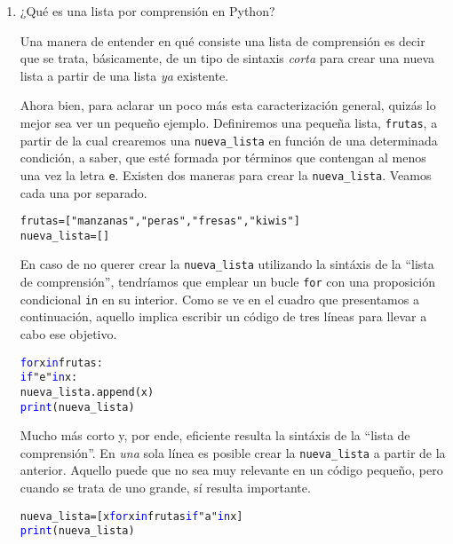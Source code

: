 \documentclass{article}
\begin{document}
\begin{enumerate}
\item ¿Qué es una lista por comprensión en Python?
\par \hspace{5pt} Una manera de entender en qué consiste una lista de comprensión es decir que se trata, básicamente, de un tipo de sintaxis \emph{corta} para crear una nueva lista a partir de una lista \emph{ya} existente.
\par \hspace{5pt} Ahora bien, para aclarar un poco más esta caracterización general, quizás lo mejor sea ver un pequeño ejemplo. Definiremos una pequeña lista, \verb|frutas|, a partir de la cual crearemos una \verb|nueva_lista| en función de una determinada condición, a saber, que esté formada por términos que contengan al menos una vez la letra \verb|e|. Existen dos maneras para crear la \verb|nueva_lista|. Veamos cada una por separado.
\begin{tcolorbox}
\begin{alltt}
frutas = ["manzanas", "peras", "fresas", "kiwis"]
nueva_lista = [ ]
\end{alltt}        
\end{tcolorbox} 
\par \hspace{5pt} En caso de no querer crear la \verb|nueva_lista| utilizando la sintáxis de la ``lista de comprensión'', tendríamos que emplear un bucle \verb|for| con una proposición condicional \verb|in| en su interior. Como se ve en el cuadro que presentamos a continuación, aquello implica escribir un código de tres líneas para llevar a cabo ese objetivo.
\begin{tcolorbox}
\begin{alltt}
\textcolor{blue}{for} x \textcolor{blue}{in} frutas:
  \textcolor{blue}{if} "e" \textcolor{blue}{in} x:
    nueva_lista.append(x)
\textcolor{blue}{print}(nueva_lista)
\end{alltt}        
\end{tcolorbox}
 Mucho más corto y, por ende, eficiente resulta la sintáxis de la ``lista de comprensión''. En \emph{una} sola línea es posible crear la \verb|nueva_lista| a partir de la anterior. Aquello puede que no sea muy relevante en un código pequeño, pero cuando se trata de uno grande, sí resulta importante.
\begin{tcolorbox}
\begin{alltt}
nueva_lista = [x \textcolor{blue}{for} x \textcolor{blue}{in} frutas \textcolor{blue}{if} "a" \textcolor{blue}{in} x]
\textcolor{blue}{print}(nueva_lista)
\end{alltt}        
\end{tcolorbox}
\vspace{0.5cm}
  

\end{enumerate}
\end{document}
